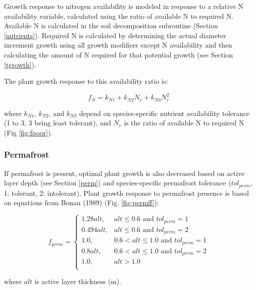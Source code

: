 \documentclass[a4paper, 12pt] {report}
\begin{document}
Growth response to nitrogen availability is modeled in response to a relative N availability variable, calculated using the ratio of available N to required N. Available N is calculated in the soil decomposition subroutine (Section \ref{nutrients}). Required N is calculated by determining the actual diameter increment growth using all growth modifiers except N availability and then calculating the amount of N required for that potential growth (see Section \ref{tgrowth}). 

The plant growth response to this availability ratio is:

\begin{equation} \label{Nf}
f_{N} = k_{N1} + k_{N2}N_r + k_{N3}N_r^2
\end{equation}

where $k_{N1}$, $k_{N2}$, and $k_{N3}$ depend on species-specific nutrient availability tolerance (1 to 3, 3 being least tolerant), and $N_r$ is the ratio of available N to required N (Fig \ref{fig:fpoor}).


\subsubsection{Permafrost}

If permafrost is present, optimal plant growth is also decreased based on active layer depth (see Section \ref{perm}) and species-specific permafrost tolerance ($tol_{perm}$, 1: tolerant, 2: intolerant). Plant growth response to permafrost presence is based on equations from Bonan (1989) (Fig. \ref{fig:permff}):

\begin{equation} \label{permf}
f_{perm} = \begin{cases}
1.28alt, & \text{$alt \leq 0.6$ and $tol_{perm} = 1$}\\
0.494alt, & \text{$alt \leq 0.6$ and $tol_{perm} = 2$}\\
1.0, & \text{$0.6 < alt \leq 1.0$ and $tol_{perm} = 1$}\\
0.8alt, & \text{$0.6 < alt \leq 1.0$ and $tol_{perm} = 2$}\\
1.0, & \text{$alt > 1.0$}\\
\end{cases}
\end{equation}

where $alt$ is active layer thickness (m).
\end{document}
